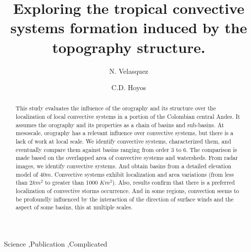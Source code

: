\documentclass[preprint,12pt]{elsarticle}
\begin{document}
\begin{frontmatter}


\title{Exploring the tropical convective systems formation induced by the  topography structure.}




\author[1,2]{N. Velasquez}
\author[2, 3]{C.D. Hoyos}

\address[1]{Iowa University, IIHR}
\address[2]{EAFIT university.}
\address[3]{Universidad nacional de Colombia.}

\begin{abstract}
This study evaluates the influence of the orography and its structure over the localization of local convective systems in a portion of the Colombian central Andes. It assumes the orography and its properties as a chain of basins and sub-basins.  At mesoscale, orography has a relevant influence over convective systems, but there is a lack of work at local scale. We identify convective systems, characterized them, and eventually compare them against basins ranging from order 3 to 6.  The comparison is made based on the overlapped area of convective systems and watersheds.  From radar images, we identify convective systems. And obtain basins from a detailed elevation model of 40$m$.  Convective systems exhibit localization and area variations (from less than $2km^2$ to greater than 1000 $Km^2$).  Also, results confirm that there is a preferred localization of convective storms occurrence. And in some regions, convection seems to be profoundly influenced by the interaction of the direction of surface winds and the aspect of some basins, this at multiple scales.
\end{abstract}

\begin{keyword}
Science \sep Publication \sep Complicated


\end{keyword}

\end{frontmatter}
\end{document}
